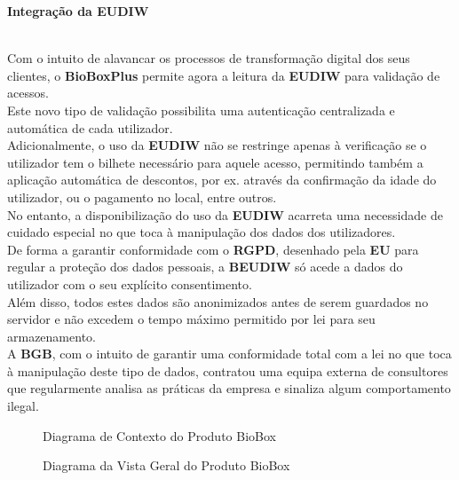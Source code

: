 \documentclass[12pt,a4paper]{article}
\begin{document}
{\begin{small}
\begin{normalsize}
\textbf{Integração da EUDIW}
\end{normalsize}\\
Com o intuito de alavancar os processos de transformação digital dos seus clientes, o \textbf{BioBoxPlus} permite agora a leitura da \textbf{EUDIW} para validação de acessos.\\
Este novo tipo de validação possibilita uma autenticação centralizada e automática de cada utilizador.\\
Adicionalmente, o uso da \textbf{EUDIW} não se restringe apenas à verificação se o utilizador tem o bilhete necessário para aquele acesso, permitindo também a aplicação automática de descontos, por ex. através da confirmação da idade do utilizador, ou o pagamento no local, entre outros.\\
No entanto, a disponibilização do uso da \textbf{EUDIW} acarreta uma necessidade de cuidado especial no que toca à manipulação dos dados dos utilizadores.\\
De forma a garantir conformidade com o \textbf{RGPD}, desenhado pela \textbf{EU} para regular a proteção dos dados pessoais, a \textbf{BEUDIW} só acede a dados do utilizador com o seu explícito consentimento.\\
Além disso, todos estes dados são anonimizados antes de serem guardados no servidor e não excedem o tempo máximo permitido por lei para seu armazenamento.\\
A \textbf{BGB}, com o intuito de garantir uma conformidade total com a lei no que toca à manipulação deste tipo de dados, contratou uma equipa externa de consultores que regularmente analisa as práticas da empresa e sinaliza algum comportamento ilegal.\\
\end{small}
}

\begin{landscape}
  \begin{figure}
    \centering
    
    \caption{Diagrama de Contexto do Produto BioBox}
    \label{fig:A1-1}
  \end{figure}
\end{landscape}

\begin{landscape}
  \begin{figure}
    \centering
    
    \caption{Diagrama da Vista Geral do Produto BioBox}
    \label{fig:A2-1}
  \end{figure}
\end{landscape}
\end{document}
